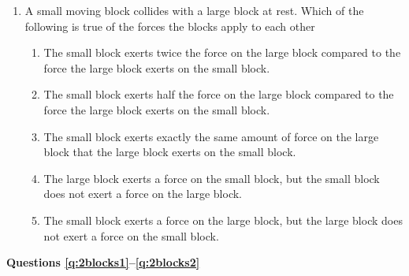 \documentclass{../../../oss-classkick}
\begin{document}
\genheader


\genmultidirections

\gengravity

\raggedcolumns
\begin{multicols*}{2}
  \begin{enumerate}[leftmargin=18pt]
  \item A small moving block collides with a large block at rest. Which of the
    following is true of the forces the blocks apply to each other
    \begin{enumerate}[noitemsep,topsep=0pt,leftmargin=18pt,label=(\Alph*)]
    \item The small block exerts twice the force on the large block
      compared to the force the large block exerts on the small block.
    \item The small block exerts half the force on the large block compared
      to the force the large block exerts on the small block.
    \item The small block exerts exactly the same amount of force on the
      large block that the large block exerts on the small block.
    \item The large block exerts a force on the small block, but the small
      block does not exert a force on the large block.
    \item The small block exerts a force on the large block, but the large
      block does not exert a force on the small block.
    \end{enumerate}
    \vspace{.6in}
  \end{enumerate}
  
  \textbf{Questions \ref{q:2blocks1}--\ref{q:2blocks2}}


\end{multicols*}
\end{document}
